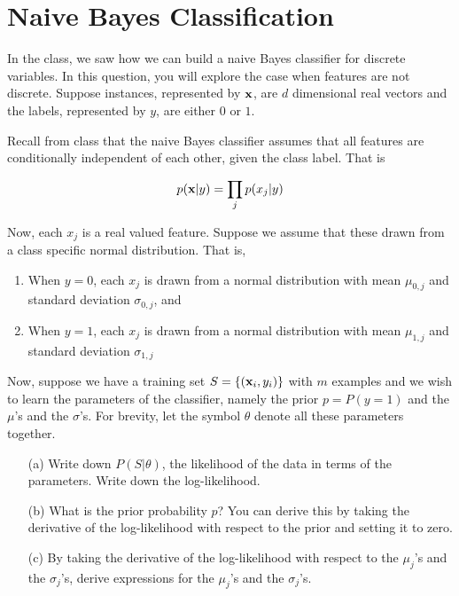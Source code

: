 \section{Naive Bayes Classification}

In the class, we saw how we can build a naive Bayes classifier for
discrete variables. In this question, you will explore the case when
features are not discrete. Suppose instances, represented by ${\bf x}$,
are $d$ dimensional real vectors and the labels, represented by $y$,
are either $0$ or $1$.

Recall from class that the naive Bayes classifier assumes that all
features are conditionally independent of each other, given the class
label. That is 

$$p({\bf x} | y) = \prod_j p(x_j | y)$$

Now, each $x_j$ is a real valued feature. Suppose we assume that these
drawn from a class specific normal distribution. That is,
\begin{enumerate}
\item When $y = 0$, each $x_j$ is drawn from a normal distribution
  with mean $\mu_{0,j}$ and standard deviation $\sigma_{0,j}$, and
\item When $y = 1$, each $x_j$ is drawn from a normal distribution
  with mean $\mu_{1,j}$ and standard deviation $\sigma_{1,j}$
\end{enumerate}


Now, suppose we have a training set $S = \{({\bf x}_i, y_i)\}$ with $m$
examples and we wish to learn the parameters of the classifier, namely
the prior $p = P(y = 1)$ and the $\mu$'s and the $\sigma$'s. For
brevity, let the symbol $\theta$ denote all these parameters together.

\begin{enumerate}
\item[(a)] Write down $P(S | \theta)$, the likelihood of the data
  in terms of the parameters. Write down the log-likelihood.

\item[(b)] What is the prior probability $p$? You can derive this by
  taking the derivative of the log-likelihood with respect to the
  prior and setting it to zero.

\item[(c)] By taking the derivative of the log-likelihood with respect
  to the $\mu_j$'s and the $\sigma_j$'s, derive expressions for the
  $\mu_j$'s and the $\sigma_j$'s.

\end{enumerate}



